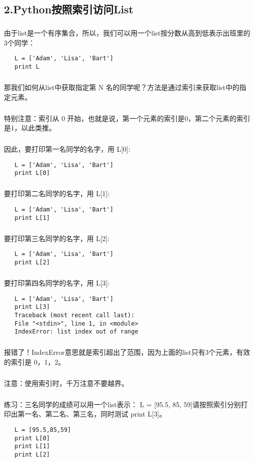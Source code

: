 \documentclass{article}
\begin{document}
\begin{CJK}{UTF8}{gbsn}
\section*{2.Python按照索引访问List}
\subparagraph*{}
由于list是一个有序集合，所以，我们可以用一个list按分数从高到低表示出班里的3个同学：
\begin{verbatim}
   L = ['Adam', 'Lisa', 'Bart']
   print L
\end{verbatim}
\subparagraph*{}
那我们如何从list中获取指定第 N 名的同学呢？方法是通过索引来获取list中的指定元素。
\subparagraph*{}
特别注意：索引从 0 开始，也就是说，第一个元素的索引是0，第二个元素的索引是1，以此类推。
\subparagraph*{}
因此，要打印第一名同学的名字，用 L[0]:
\begin{verbatim}
   L = ['Adam', 'Lisa', 'Bart']
   print L[0]
\end{verbatim}
\subparagraph*{}
要打印第二名同学的名字，用 L[1]:
\begin{verbatim}
   L = ['Adam', 'Lisa', 'Bart']
   print L[1]
\end{verbatim}
\subparagraph*{}
要打印第三名同学的名字，用 L[2]:
\begin{verbatim}
   L = ['Adam', 'Lisa', 'Bart']
   print L[2]
\end{verbatim}
\subparagraph*{}
要打印第四名同学的名字，用 L[3]:
\begin{verbatim}
   L = ['Adam', 'Lisa', 'Bart']
   print L[3]
   Traceback (most recent call last):
   File "<stdin>", line 1, in <module>
   IndexError: list index out of range
\end{verbatim}
\subparagraph*{}
报错了！IndexError意思就是索引超出了范围，因为上面的list只有3个元素，有效的索引是 0，1，2。
\subparagraph*{}
注意：使用索引时，千万注意不要越界。
\subparagraph*{}
练习：三名同学的成绩可以用一个list表示：
L = [95.5, 85, 59]请按照索引分别打印出第一名、第二名、第三名，同时测试 print L[3]。
\begin{verbatim}
   L = [95.5,85,59]
   print L[0]
   print L[1]
   print L[2]
\end{verbatim}

\end{CJK}
\end{document}
